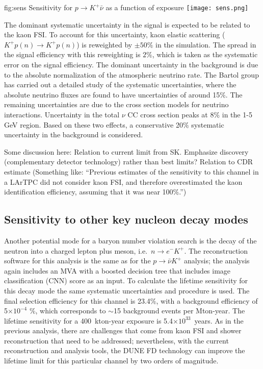 \begin{dunefigure}
{fig:sens}
{Sensitivity for $p\rightarrow K^{+} \bar{\nu}$ as a function of exposure}
\texttt{[image: sens.png]}
\end{dunefigure} 

The dominant systematic uncertainty in the signal is expected to be related to the kaon FSI. To account for this uncertainty, kaon elastic scattering ($K^{+}p(n)\rightarrow K^{+}p(n)$) is reweighted by $\pm 50\%$ in the simulation. The spread in the signal efficiency with this reweighting is $2\%$, which is taken as the  systematic error on the signal efficiency.
The dominant uncertainty in the background 
is due to the absolute normalization of the atmospheric neutrino rate. The Bartol group has carried out a detailed study of the systematic uncertainties, where the absolute neutrino fluxes are found to have uncertainties of around 15$\%$.
The remaining uncertainties are due to the cross section models for neutrino interactions. Uncertainty in the total $\nu$ CC cross section peaks at 8$\%$ in the 1-5 GeV region.
Based on these two effects, a conservative 20$\%$ systematic uncertainty in the background is considered.

Some discussion here: Relation to current limit from SK. Emphasize discovery (complementary detector technology) rather than best limits? Relation to CDR estimate (Something like: ``Previous estimates of the sensitivity to this channel in a LArTPC did not consider kaon FSI, and therefore overestimated the kaon identification efficiency, assuming that it was near 100\%.'')

\subsection{Sensitivity to other key nucleon decay modes}
\label{subsec:nonaccel-ndk-other}

Another potential mode for a baryon number violation search is the decay of the neutron into a charged lepton plus meson, i.e.~$n\rightarrow e^{-}K^{+}$. The reconstruction software for this analysis is the same as for the $p\rightarrow \bar{\nu} K^{+} $ analysis; the analysis again includes an MVA with a boosted decision tree that includes image classification (CNN) score as an input. To calculate the lifetime sensitivity for this decay mode the same systematic uncertainties and procedure is used. The final selection efficiency for this channel is 23.4\%, with a background efficiency of 5$\times 10^{-4}$ \%, which corresponds to $\sim$15 background events per Mton-year. The lifetime sensitivity for a 400~kton-year exposure is 5.4$\times 10^{33}$~years. As in the previous analysis, there are challenges that come from kaon FSI and shower reconstruction that need to be addressed; nevertheless, with the current reconstruction and analysis tools, the DUNE FD technology can improve the lifetime limit for this particular channel by two orders of magnitude.

